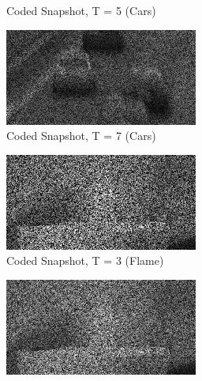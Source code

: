 \documentclass{article}
\begin{document}
\begin{enumerate}
\begin{figure}[h!]
\begin{subfigure}{0.3\textwidth}
        \caption{Coded Snapshot, T = 5 (Cars)}
    \end{subfigure}
    \begin{subfigure}{0.3\textwidth}
        \centering
        \includegraphics[width=\linewidth]{../images/cars/coded snapshot, T = 7.png}
        \caption{Coded Snapshot, T = 7 (Cars)}
    \end{subfigure}
    \begin{subfigure}{0.3\textwidth}
        \centering
        \includegraphics[width=\linewidth]{../images/flame/coded snapshot, T = 3.png}
        \caption{Coded Snapshot, T = 3 (Flame)}
    \end{subfigure}
    \begin{subfigure}{0.3\textwidth}
        \centering
        \includegraphics[width=\linewidth]{../images/flame/coded snapshot, T = 5.png}

\end{subfigure}
\end{figure}
\end{enumerate}
\end{document}
